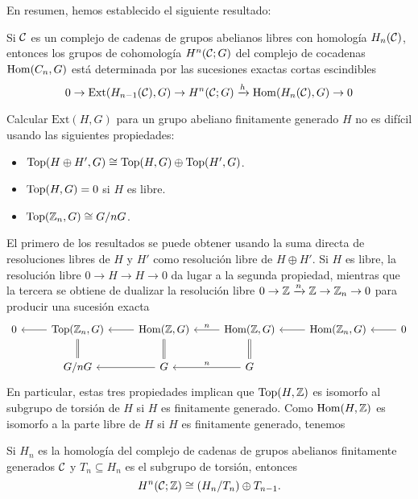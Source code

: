 \documentclass[TA.tex]{subfiles}
\begin{document}
En resumen, hemos establecido el siguiente resultado:
\begin{teorema}
Si $\mathcal{C}$ es un complejo de cadenas de grupos abelianos libres con homología $H_n(\mathcal{C})$, entonces los grupos de cohomología $H^n(\mathcal{C};G)$ del complejo de cocadenas $\operatorname{Hom}(C_n,G)$ está determinada por las sucesiones exactas cortas escindibles
\[
0\to \mathrm{Ext}(H_{n-1}(\mathcal{C}),G)\to H^n(\mathcal{C};G)\xrightarrow{h}\operatorname{Hom}(H_n(\mathcal{C}),G)\to 0
\]

Calcular $\mathrm{Ext}(H,G)$ para un grupo abeliano finitamente generado $H$ no es difícil usando las siguientes propiedades:
\begin{itemize}
\item $\operatorname{Top}(H\oplus H',G)\cong\operatorname{Top}(H,G)\oplus\operatorname{Top}(H',G)$.
\item $\operatorname{Top}(H,G)=0$ si $H$ es libre.
\item $\operatorname{Top}(\mathbb{Z}_n,G)\cong G/nG$.
\end{itemize}
\end{teorema}
El primero de los resultados se puede obtener usando la suma directa de resoluciones libres de $H$ y $H'$ como resolución libre de $H\oplus H'$. Si $H$ es libre, la resolución libre $0\to H\to H\to 0$ da lugar a la segunda propiedad, mientras que la tercera se obtiene de dualizar la resolución libre $0\to\mathbb{Z}\xrightarrow{n}\mathbb{Z}\to\mathbb{Z}_n\to 0$ para producir una sucesión exacta
\[
\begin{tikzcd}
0 & \Ext(\Z_n,G)\arrow[l]\arrow[d,equals] & \Hom(\Z,G)\arrow[l]\arrow[d, equals] &\Hom(\Z,G)\arrow[l, "n"' ] & \Hom(\Z_n,G)\arrow[l] & 0\arrow[l]\\
& G/nG &G\arrow[l] & G\arrow[l, "n"']\arrow[u, equals]
\end{tikzcd}
\]
En particular, estas tres propiedades implican que $\operatorname{Top}(H,\mathbb{Z})$ es isomorfo al subgrupo de torsión de $H$ si $H$ es finitamente generado. Como $\operatorname{Hom}(H,\mathbb{Z})$ es isomorfo a la parte libre de $H$ si $H$ es finitamente generado, tenemos
\begin{coro}\label{3.3}
Si $H_n$ es la homología del complejo de cadenas de grupos abelianos finitamente generados $\mathcal{C}$ y $T_n\subseteq H_n$ es el subgrupo de torsión, entonces
\[
H^n(\mathcal{C};\mathbb{Z})\cong (H_n/T_n)\oplus T_{n-1}.
\]
\end{coro} 
\end{document}
